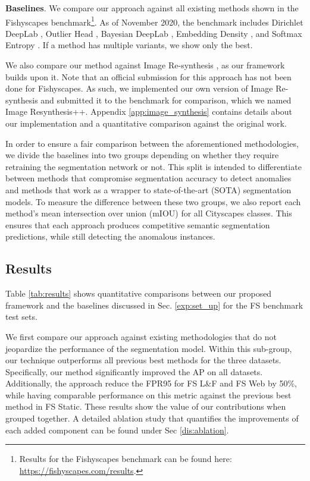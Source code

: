 \documentclass[final]{cvpr}
\begin{document}
\textbf{Baselines}.
We compare our approach against all existing methods shown in the Fishyscapes benchmark\footnote{Results for the Fishyscapes benchmark can be found here: \url{https://fishyscapes.com/results}.}.
As of November 2020, the benchmark includes Dirichlet DeepLab \cite{prior_entropy}, Outlier Head \cite{anomaly_score}, Bayesian DeepLab \cite{bayes_deep}, Embedding Density \cite{fishyscapes}, and Softmax Entropy \cite{MSP}. If a method has multiple variants, we show only the best. 

We also compare our method against Image Re-synthesis \cite{epfl}, as our framework builds upon it. Note that an official submission for this approach has not been done for Fishyscapes. As such, we implemented our own version of Image Re-synthesis and submitted it to the benchmark for comparison, which we named Image Resynthesis++.  
Appendix \ref{app:image_synthesis} contains details about our implementation and a quantitative comparison against the original work.

In order to ensure a fair comparison between the aforementioned methodologies, we divide the baselines into two groups depending on whether they require retraining the segmentation network or not. This split is intended to differentiate between methods that compromise segmentation accuracy to detect anomalies and methods that work as a wrapper to state-of-the-art (SOTA) segmentation models. To measure the difference between these two groups, we also report each method's mean intersection over union (mIOU) for all Cityscapes classes. This ensures that each approach produces competitive semantic segmentation predictions, while still detecting the anomalous instances.  

\subsection{Results}
\label{exp:results}
Table \ref{tab:results} shows quantitative comparisons between our proposed framework and the baselines discussed in Sec. \ref{exp:set_up} for the FS benchmark test sets. 

We first compare our approach against existing methodologies that do not jeopardize the performance of the segmentation model. 
Within this sub-group, our technique outperforms all previous best methods for the three datasets. Specifically, our method significantly improved the AP on all datasets. Additionally, the approach reduce the FPR95 for FS L\&F and FS Web by 50\%, while having comparable performance on this metric against the previous best method in FS Static. These results show the value of our contributions when grouped together. A detailed ablation study that quantifies the improvements of each added component can be found under Sec \ref{dis:ablation}.  
\end{document}
